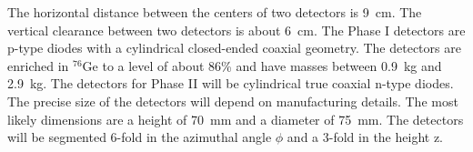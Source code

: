 The horizontal distance between the centers of two detectors is 9~cm. The vertical clearance between two detectors is about 6~cm. The Phase I detectors are p-type diodes with a cylindrical closed-ended coaxial geometry. The detectors are enriched in $^{76}$Ge to a level of about 86\% and have masses between 0.9~kg and 2.9~kg. The detectors for Phase II will be cylindrical true coaxial n-type diodes. The precise size of the detectors will depend on manufacturing details. The most likely dimensions are a height of 70~mm and a diameter of 75~mm. The detectors will be segmented 6-fold in the azimuthal angle $\phi$ and a 3-fold in the height z. 

\begin{figure}[tbhp]
  \centering
  \hfil %

\end{figure}
